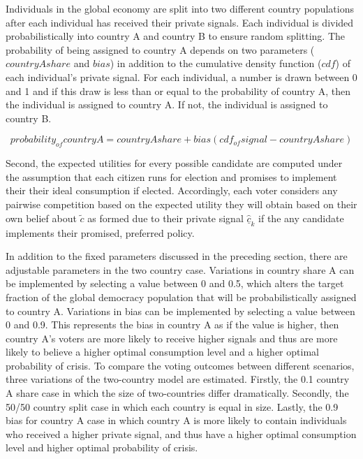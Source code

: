 \documentclass[11pt,preprint, authoryear]{elsarticle}
\numberwithin{equation}{section}
\numberwithin{figure}{section}
\numberwithin{table}{section}
\begin{document}
Individuals in the global economy are split into two different country
populations after each individual has received their private signals.
Each individual is divided probabilistically into country A and country
B to ensure random splitting. The probability of being assigned to
country A depends on two parameters (\(countryAshare\) and \(bias\)) in
addition to the cumulative density function (\(cdf\)) of each
individual's private signal. For each individual, a number is drawn
between 0 and 1 and if this draw is less than or equal to the
probability of country A, then the individual is assigned to country A.
If not, the individual is assigned to country B.

\[probability_{of}country A = country A share + bias(cdf_{of}signal - country A share)\]

Second, the expected utilities for every possible candidate are computed
under the assumption that each citizen runs for election and promises to
implement their their ideal consumption if elected. Accordingly, each
voter considers any pairwise competition based on the expected utility
they will obtain based on their own belief about \(\tilde{c}\) as formed
due to their private signal \(\hat{\underline{c}}_k\) if the any
candidate implements their promised, preferred policy.

In addition to the fixed parameters discussed in the preceding section,
there are adjustable parameters in the two country case. Variations in
country share A can be implemented by selecting a value between 0 and
0.5, which alters the target fraction of the global democracy population
that will be probabilistically assigned to country A. Variations in bias
can be implemented by selecting a value between 0 and 0.9. This
represents the bias in country A as if the value is higher, then country
A's voters are more likely to receive higher signals and thus are more
likely to believe a higher optimal consumption level and a higher
optimal probability of crisis. To compare the voting outcomes between
different scenarios, three variations of the two-country model are
estimated. Firstly, the 0.1 country A share case in which the size of
two-countries differ dramatically. Secondly, the 50/50 country split
case in which each country is equal in size. Lastly, the 0.9 bias for
country A case in which country A is more likely to contain individuals
who received a higher private signal, and thus have a higher optimal
consumption level and higher optimal probability of crisis.
\end{document}
